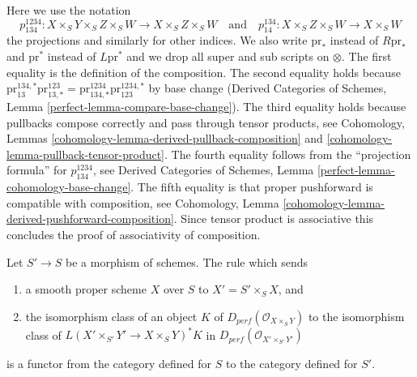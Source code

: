 Here we use the notation
$$
p^{1234}_{134} : X \times_S Y \times_S Z \times_S W
\to X \times_S Z \times_S W
\quad\text{and}\quad
p^{134}_{14} : X \times_S Z \times_S W \to X \times_S W
$$
the projections and similarly for other indices.
We also write $\text{pr}_*$ instead of $R\text{pr}_*$ and
$\text{pr}^*$ instead of $L\text{pr}^*$ and we drop
all super and sub scripts on $\otimes$.
The first equality is the definition of the composition.
The second equality holds because
$\text{pr}^{134, *}_{13} \text{pr}^{123}_{13, *} =
\text{pr}^{1234}_{134, *} \text{pr}^{1234, *}_{123}$
by base change (Derived Categories of Schemes, Lemma
\ref{perfect-lemma-compare-base-change}).
The third equality holds because pullbacks compose
correctly and pass through tensor products, see
Cohomology, Lemmas \ref{cohomology-lemma-derived-pullback-composition} and
\ref{cohomology-lemma-pullback-tensor-product}.
The fourth equality follows from the ``projection formula'' for
$p^{1234}_{134}$, see Derived Categories of Schemes, Lemma
\ref{perfect-lemma-cohomology-base-change}.
The fifth equality is that proper pushforward is compatible
with composition, see
Cohomology, Lemma \ref{cohomology-lemma-derived-pushforward-composition}.
Since tensor product is associative
this concludes the proof of associativity of composition.

\begin{lemma}
\label{lemma-base-change-is-functor}
Let $S' \to S$ be a morphism of schemes.
The rule which sends
\begin{enumerate}
\item a smooth proper scheme $X$ over $S$ to $X' =  S' \times_S X$, and
\item the isomorphism class of an object $K$
of $D_{perf}(\mathcal{O}_{X \times_S Y})$ to the isomorphism class of
$L(X' \times_{S'} Y' \to X \times_S Y)^*K$
in $D_{perf}(\mathcal{O}_{X' \times_{S'} Y'})$
\end{enumerate}
is a functor from the category defined for $S$ to the category
defined for $S'$.
\end{lemma}

